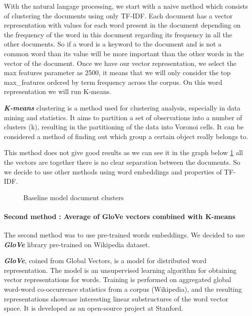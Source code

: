 \documentclass[article,twocolumn]{IEEEtran}
\begin{document}
With the natural langage processing, we start with a naive method which
consists of clustering the documents using only TF-IDF. Each document
has a vector representation with values for each word present in the
document depending on the frequency of the word in this document
regarding its frequency in all the other documents. So if a word is a
keyword to the document and is not a common word than its value will be
more important than the other words in the vector of the document. Once
we have our vector representation, we select the max features parameter
as 2500, it means that we will only consider the top max\_features
ordered by term frequency across the corpus. On this word representation
we will run K-means.

\textbf{\emph{K-means}} clustering is a method used for clustering
analysis, especially in data mining and statistics. It aims to partition
a set of observations into a number of clusters (k), resulting in the
partitioning of the data into Voronoi cells. It can be considered a
method of finding out which group a certain object really belongs to.

This method does not give good results as we can see it in the graph
below \ref{fig3} all the vectors are together there is no clear
separation between the documents. So we decide to use other methods
using word embeddings and properties of TF-IDF.


    \begin{figure}
        \begin{center}\end{center}
        \caption{Baseline model document clusters}
        \label{fig3}
    \end{figure}
    
    \hypertarget{second-method-average-of-glove-vectors-combined-with-k-means}{%
\paragraph{Second method : Average of GloVe vectors combined with
K-means}\label{second-method-average-of-glove-vectors-combined-with-k-means}}

The second method was to use pre-trained words embeddings. We decided to
use \textbf{\emph{GloVe}} library pre-trained on Wikipedia dataset.

\textbf{\emph{GloVe}}, coined from Global Vectors, is a model for
distributed word representation. The model is an unsupervised learning
algorithm for obtaining vector representations for words. Training is
performed on aggregated global word-word co-occurrence statistics from a
corpus (Wikipedia), and the resulting representations showcase
interesting linear substructures of the word vector space. It is
developed as an open-source project at Stanford.\cite{GloVe}
\end{document}
